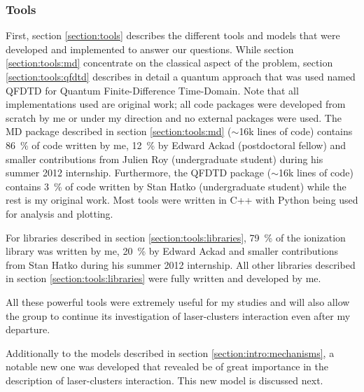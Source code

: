

\subsubsection{Tools}

First, section \ref{section:tools} describes the different tools and models
that were developed and implemented to answer our questions. While section
\ref{section:tools:md} concentrate on the classical aspect of the problem,
section \ref{section:tools:qfdtd} describes in detail a quantum approach that
was used named QFDTD for Quantum Finite-Difference Time-Domain.
Note that all implementations used are original work; all code packages
were developed from scratch by me or under my direction and no external packages
were used. The MD package described in
section \ref{section:tools:md} ($\sim$16k lines of code) contains 86~\% of code
written by me, 12~\% by Edward Ackad (postdoctoral fellow) and smaller contributions from
Julien Roy (undergraduate student) during his summer 2012 internship. Furthermore, the QFDTD package
($\sim$16k lines of code) contains 3~\% of code written by Stan Hatko (undergraduate student) while the
rest is my original work. Most tools were written in C++ with Python being used
for analysis and plotting.

For libraries described in section \ref{section:tools:libraries}, 79~\% of the
ionization library was written by me, 20~\% by Edward Ackad and smaller
contributions from Stan Hatko during his summer 2012 internship. All other
libraries described in section \ref{section:tools:libraries} were fully
written and developed by me.


All these powerful tools were extremely useful for my studies and will also allow
the group to continue its investigation of laser-clusters interaction even
after my departure.

Additionally to the models described in
section \ref{section:intro:mechanisms}, a notable new one was
developed that revealed be of great importance in the description of
laser-clusters interaction. This new model is discussed next.



